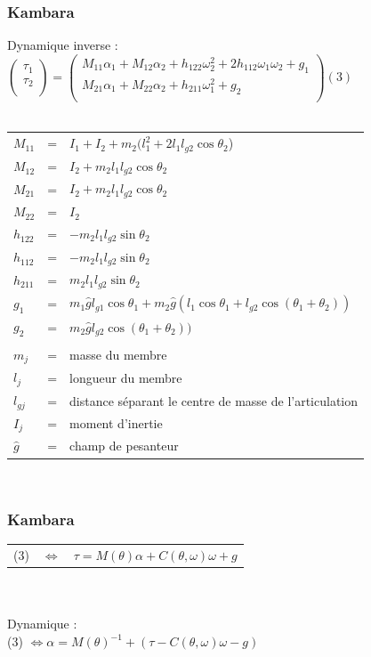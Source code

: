 \documentclass{beamer}
\begin{document}
\begin{frame}
\frametitle{Kambara}
Dynamique inverse : \\
$
\begin{pmatrix}
    \tau_1 \\
    \tau_2 \\
\end{pmatrix}
=
\begin{pmatrix}
    M_{11}\alpha_1 + M_{12}\alpha_2 + h_{122}\omega_2^2 + 2h_{112}\omega_1\omega_2 + g_1 \\
    M_{21}\alpha_1 + M_{22}\alpha_2 + h_{211}\omega_1^2 + g_2 \\
\end{pmatrix}
(3)$\\
~\\
\begin{tabular}{lcl}
    $M_{11}$ & = & $I_1 + I_2 + m_2(l_1^2 + 2 l_1 l_{g2}\cos\theta_2$) \\
    $M_{12}$ & = & $I_2 + m_2l_1l_{g2}\cos\theta_2$ \\
    $M_{21}$ & = & $I_2 + m_2l_1l_{g2}\cos\theta_2$ \\
    $M_{22}$ & = & $I_2$ \\
    $h_{122}$ & = & $-m_2 l_1 l_{g2} \sin\theta_2$ \\
    $h_{112}$ & = & $-m_2 l_1 l_{g2} \sin\theta_2$ \\
    $h_{211}$ & = & $m_2 l_1 l_{g2} \sin\theta_2$ \\
    $g_1$ & = & $m_1 \hat{g} l_{g1} \cos\theta_1 + m_2 \hat{g} (l_1 \cos\theta_1 + l_{g2} \cos(\theta_1 + \theta_2))$ \\
    $g_2$ & = & $m_2 \hat{g} l_{g2} \cos(\theta_1 + \theta_2))$ \\
    & & \\
    $m_j$ & = & masse du membre \\
    $l_j$ & = & longueur du membre \\
    $l_{gj}$ & = & distance séparant le centre de masse de l'articulation \\
    $I_{j}$ & = & moment d'inertie \\
    $\hat{g}$ & = & champ de pesanteur \\
\end{tabular}\\
\end{frame}

\begin{frame}
\frametitle{Kambara}
\begin{tabular}{lcl}
    (3) & $\Leftrightarrow$ & $\tau = M(\theta)\alpha + C(\theta, \omega) \omega + g$ \\
\end{tabular}\\
~\\
Dynamique :\\
(3) $\Leftrightarrow \alpha = M(\theta)^{-1} + (\tau - C(\theta, \omega) \omega - g) $
\end{frame}
\end{document}
